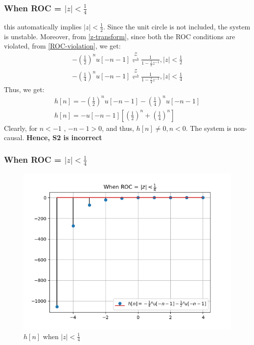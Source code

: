 \documentclass{beamer}
\providecommand{\sbrak}[1]{\ensuremath{{}\left[#1\right]}}
\providecommand{\brak}[1]{\ensuremath{\left(#1\right)}}
\providecommand{\ztrans}{\overset{\mathcal{Z}}{ \rightleftharpoons}}
\providecommand{\abs}[1]{\left\vert#1\right\vert}
\begin{document}
\begin{frame}
    \frametitle{When ROC = $\abs{z} < \frac{1}{4}$}
    \begin{flushleft}
    this automatically implies $\abs{z} < \frac{1}{2}$. Since the unit circle is not included, the system is unstable. Moreover, from \eqref{z-transform}, since both the ROC conditions are violated, from \eqref{ROC-violation}, we get:
\begin{align}
    -\brak{\frac{1}{2}}^nu[-n-1] \ztrans \frac{1}{1 - \frac{1}{2}z^{-1}} , \abs{z} < \frac{1}{2}\\
    -\brak{\frac{1}{4}}^nu[-n-1] \ztrans \frac{1}{1 - \frac{1}{4}z^{-1}} , \abs{z} < \frac{1}{4}
\end{align}
Thus, we get:
\begin{align}
    h[n] = -\brak{\frac{1}{2}}^nu[-n-1] -\brak{\frac{1}{4}}^nu[-n-1]\\
    h[n] = -u[-n-1]\sbrak{\brak{\frac{1}{2}}^n + \brak{\frac{1}{4}}^n}
\end{align}
Clearly, for $n<-1$ , $-n-1 > 0$, and thus, $h[n] \neq 0 , n<0$. The system is non-causal.
\textbf{Hence, S2 is incorrect}\\
   \end{flushleft}
\end{frame}

\begin{frame}
    \frametitle{When ROC = $\abs{z} < \frac{1}{4}$}
    \begin{flushleft}
      \begin{figure}[!ht]
\centering
 \includegraphics[width=\columnwidth]{graphs/S2.png}
 \caption{$h[n]$ when $\abs{z} < \frac{1}{4}$}
 \end{figure}
   \end{flushleft}
\end{frame}
\end{document}
